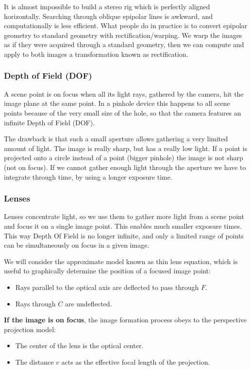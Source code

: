 \documentclass{article}
\begin{document}
It is almost impossible to build a stereo rig which is perfectly aligned horizontally.
Searching through oblique epipolar lines is awkward, and computationally is less efficient.
What people do in practice is to convert epipolar geometry to standard geometry with rectification/warping.
We warp the images as if they were acquired through a standard geometry, then we can compute and apply to both images a transformation known as rectification.

\subsubsection{Depth of Field (DOF)}

A scene point is on focus when all its light rays, gathered by the camera, hit the image plane at the same point.
In a pinhole device this happens to all scene points because of the very small size of the hole, so that the camera features an infinite Depth of Field (DOF).

The drawback is that such a small aperture allows gathering a very limited amount of light.
The image is really sharp, but has a really low light.
If a point is projected onto a circle instead of a point (bigger pinhole) the image is not sharp (not on focus).
If we cannot gather enough light through the aperture we have to integrate through time, by using a longer exposure time.

\subsubsection{Lenses}

Lenses concentrate light, so we use them to gather more light from a scene point and focus it on a single image point.
This enables much smaller exposure times.
This way Depth Of Field is no longer infinite, and only a limited range of points can be simultaneously on focus in a given image.

We will consider the approximate model known as thin lens equation, which is useful to graphically determine the position of a focused image point:
\begin{itemize}
  \item Rays parallel to the optical axis are deflected to pass through $F$.
  \item Rays through $C$ are undeflected.
\end{itemize}

\textbf{If the image is on focus}, the image formation process obeys to the perspective projection model:
\begin{itemize}
  \item The center of the lens is the optical center.
  \item The distance $v$ acts as the effective focal length of the projection.
\end{itemize}
\end{document}

